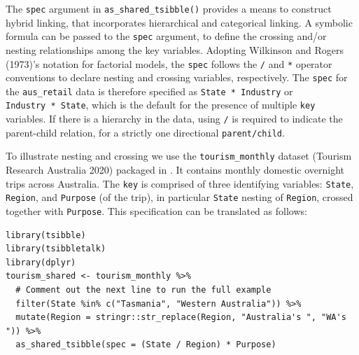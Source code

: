 The \texttt{spec} argument in \texttt{as\_shared\_tsibble()} provides a means to construct hybrid linking, that incorporates hierarchical and categorical linking. A symbolic formula can be passed to the \texttt{spec} argument, to define the crossing and/or nesting relationships among the key variables. Adopting Wilkinson and Rogers (1973)'s notation for factorial models, the \texttt{spec} follows the \texttt{/} and \texttt{*} operator conventions to declare nesting and crossing variables, respectively. The \texttt{spec} for the \texttt{aus\_retail} data is therefore specified as \texttt{State\ *\ Industry} or \texttt{Industry\ *\ State}, which is the default for the presence of multiple \texttt{key} variables. If there is a hierarchy in the data, using \texttt{/} is required to indicate the parent-child relation, for a strictly one directional \texttt{parent/child}.

To illustrate nesting and crossing we use the \texttt{tourism\_monthly} dataset (Tourism Research Australia 2020) packaged in . It contains monthly domestic overnight trips across Australia. The \texttt{key} is comprised of three identifying variables: \texttt{State}, \texttt{Region}, and \texttt{Purpose} (of the trip), in particular \texttt{State} nesting of \texttt{Region}, crossed together with \texttt{Purpose}. This specification can be translated as follows:

\begin{verbatim}
library(tsibble)
library(tsibbletalk)
library(dplyr)
tourism_shared <- tourism_monthly %>%
  # Comment out the next line to run the full example
  filter(State %in% c("Tasmania", "Western Australia")) %>%
  mutate(Region = stringr::str_replace(Region, "Australia's ", "WA's ")) %>%
  as_shared_tsibble(spec = (State / Region) * Purpose)
\end{verbatim}

